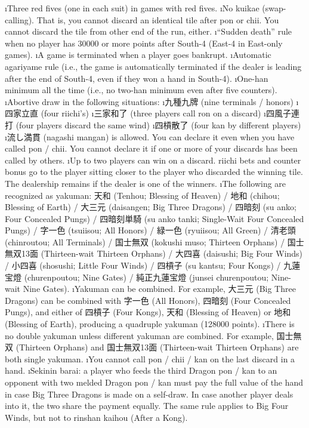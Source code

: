 \bi
\i Three red fives (one in each suit) in games with red fives.
\i No {\jap kuikae} (swap-calling). That is, you cannot discard an identical tile after {\jap pon} or {\jap chii}. You cannot discard the tile from other end of the run, either. 
\i ``Sudden death'' rule when no player has 30000 or more points after South-4 (East-4 in East-only games).
\i A game is terminated when a player goes bankrupt.
\i Automatic {\jap agariyame} rule (i.e., the game is automatically terminated if the dealer is leading after the end of South-4, even if they won a hand in South-4).
\i One-{\jap han} minimum all the time (i.e., no two-{\jap han} minimum even after five counters).
\i Abortive draw in the following situations:
	\bi
	\i 九種九牌 (nine terminals / honors)
	\i 四家立直 (four riichi's)
	\i 三家和了 (three players call {\jap ron} on a discard)
	\i 四風子連打 (four players discard the same wind)
	\i 四槓散了 (four {\jap kan} by different players)
	\ei
\i 流し満貫 ({\jap nagashi mangan}) is allowed. You can declare it even when you have called {\jap pon} / {\jap chii}. You cannot declare it if one or more of your discards has been called by others.
\i Up to two players can win on a discard. riichi bets and counter bonus go to the player sitting closer to the player who discarded the winning tile. The dealership remains if the dealer is one of the winners.
\i The following are recognized as {\jap yakuman}: 
天和 ({\jap Tenhou}; Blessing of Heaven) / 地和 ({\jap chihou}; Blessing of Earth) / 大三元 ({\jap daisangen}; Big Three Dragons) / 四暗刻 ({\jap su anko}; Four Concealed Pungs) / 四暗刻単騎 ({\jap su anko tanki}; Single-Wait Four Concealed Pungs) / 字一色 ({\jap tsuiisou}; All Honors) / 緑一色 ({\jap ryuiisou}; All Green) / 清老頭 ({\jap chinroutou}; All Terminals) / 国士無双 ({\jap kokushi muso}; Thirteen Orphans) / 国士無双13面 (Thirteen-wait Thirteen Orphans) / 大四喜 ({\jap daisushi}; Big Four Winds) / 小四喜 ({\jap shosushi}; Little Four Winds) / 四槓子 ({\jap su kantsu}; Four Kongs) / 九蓮宝燈 ({\jap churenpoutou}; Nine Gates) / 純正九蓮宝燈 ({\jap junsei churenpoutou}; Nine-wait Nine Gates).
\i {\jap Yakuman} can be combined. For example, 大三元 (Big Three Dragons) can be combined with 字一色 (All Honors), 四暗刻 (Four Concealed Pungs), and either of 四槓子 (Four Kongs), 天和 (Blessing of Heaven) or 地和 (Blessing of Earth), producing a quadruple {\jap yakuman} (128000 points). 
\i There is no double {\jap yakuman} unless different {\jap yakuman} are combined. For example, 国士無双 (Thirteen Orphans) and 国士無双13面 (Thirteen-wait Thirteen Orphans) are both single {\jap yakuman}. 
\i You cannot call {\jap pon} / {\jap chii} / {\jap kan} on the last discard in a hand. 
\i {\jap Sekinin barai}: a player who feeds the third Dragon {\jap pon} / {\jap kan} to an opponent with two melded Dragon {\jap pon} / {\jap kan} must pay the full value of the hand in case Big Three Dragons is made on a self-draw. In case another player deals into it, the two share the payment equally. The same rule applies to Big Four Winds, but not to {\jap rinshan kaihou} (After a Kong).  
\ei


